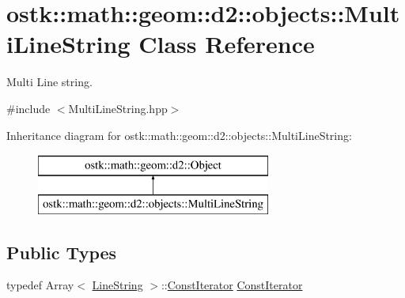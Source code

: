 \hypertarget{classostk_1_1math_1_1geom_1_1d2_1_1objects_1_1_multi_line_string}{}\section{ostk\+:\+:math\+:\+:geom\+:\+:d2\+:\+:objects\+:\+:Multi\+Line\+String Class Reference}
\label{classostk_1_1math_1_1geom_1_1d2_1_1objects_1_1_multi_line_string}


Multi Line string.  




{\ttfamily \#include $<$Multi\+Line\+String.\+hpp$>$}

Inheritance diagram for ostk\+:\+:math\+:\+:geom\+:\+:d2\+:\+:objects\+:\+:Multi\+Line\+String\+:\begin{figure}[H]
\begin{center}
\leavevmode
\includegraphics[height=2.000000cm]{classostk_1_1math_1_1geom_1_1d2_1_1objects_1_1_multi_line_string}
\end{center}
\end{figure}
\subsection*{Public Types}
\begin{DoxyCompactItemize}
\item 
typedef Array$<$ \hyperlink{classostk_1_1math_1_1geom_1_1d2_1_1objects_1_1_line_string}{Line\+String} $>$\+::\hyperlink{classostk_1_1math_1_1geom_1_1d2_1_1objects_1_1_multi_line_string_a43dc9419e5743d8a920141ba4fa10c5f}{Const\+Iterator} \hyperlink{classostk_1_1math_1_1geom_1_1d2_1_1objects_1_1_multi_line_string_a43dc9419e5743d8a920141ba4fa10c5f}{Const\+Iterator}
\end{DoxyCompactItemize}
